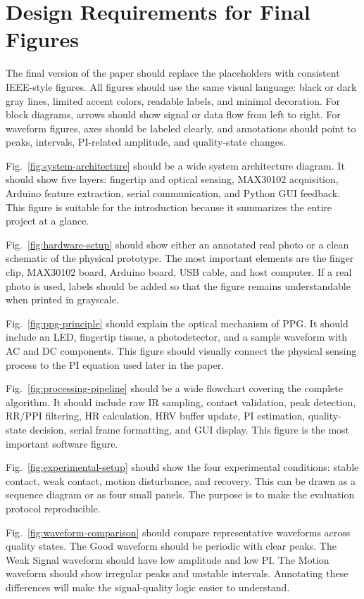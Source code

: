 \documentclass[10pt,conference]{IEEEtran}
\begin{document}
\section{Design Requirements for Final Figures}
The final version of the paper should replace the placeholders with consistent IEEE-style figures. All figures should use the same visual language: black or dark gray lines, limited accent colors, readable labels, and minimal decoration. For block diagrams, arrows should show signal or data flow from left to right. For waveform figures, axes should be labeled clearly, and annotations should point to peaks, intervals, PI-related amplitude, and quality-state changes.

Fig.~\ref{fig:system-architecture} should be a wide system architecture diagram. It should show five layers: fingertip and optical sensing, MAX30102 acquisition, Arduino feature extraction, serial communication, and Python GUI feedback. This figure is suitable for the introduction because it summarizes the entire project at a glance.

Fig.~\ref{fig:hardware-setup} should show either an annotated real photo or a clean schematic of the physical prototype. The most important elements are the finger clip, MAX30102 board, Arduino board, USB cable, and host computer. If a real photo is used, labels should be added so that the figure remains understandable when printed in grayscale.

Fig.~\ref{fig:ppg-principle} should explain the optical mechanism of PPG. It should include an LED, fingertip tissue, a photodetector, and a sample waveform with AC and DC components. This figure should visually connect the physical sensing process to the PI equation used later in the paper.

Fig.~\ref{fig:processing-pipeline} should be a wide flowchart covering the complete algorithm. It should include raw IR sampling, contact validation, peak detection, RR/PPI filtering, HR calculation, HRV buffer update, PI estimation, quality-state decision, serial frame formatting, and GUI display. This figure is the most important software figure.

Fig.~\ref{fig:experimental-setup} should show the four experimental conditions: stable contact, weak contact, motion disturbance, and recovery. This can be drawn as a sequence diagram or as four small panels. The purpose is to make the evaluation protocol reproducible.

Fig.~\ref{fig:waveform-comparison} should compare representative waveforms across quality states. The Good waveform should be periodic with clear peaks. The Weak Signal waveform should have low amplitude and low PI. The Motion waveform should show irregular peaks and unstable intervals. Annotating these differences will make the signal-quality logic easier to understand.
\end{document}

